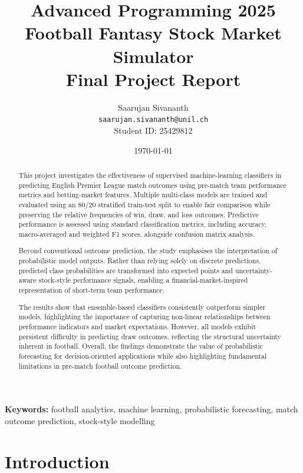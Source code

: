\documentclass[11pt,a4paper]{article}
\title{%
    \Large \textbf{Advanced Programming 2025} \\
    \vspace{0.5cm}
    \LARGE \textbf{Football Fantasy Stock Market Simulator} \\
    \vspace{0.3cm}
    \large Final Project Report
}
\author{
    Saarujan Sivananth \\
    \texttt{saarujan.sivananth@unil.ch} \\
    Student ID: 25429812
}
\date{\today}
\begin{document}
\maketitle
\thispagestyle{empty}

\begin{abstract}
This project investigates the effectiveness of supervised machine-learning classifiers in predicting English Premier League match outcomes using pre-match team performance metrics and betting-market features. Multiple multi-class models are trained and evaluated using an 80/20 stratified train-test split to enable fair comparison while preserving the relative frequencies of win, draw, and loss outcomes. Predictive performance is assessed using standard classification metrics, including accuracy, macro-averaged and weighted F1 scores, alongside confusion matrix analysis.

Beyond conventional outcome prediction, the study emphasises the interpretation of probabilistic model outputs. Rather than relying solely on discrete predictions, predicted class probabilities are transformed into expected points and uncertainty-aware stock-style performance signals, enabling a financial-market-inspired representation of short-term team performance.

The results show that ensemble-based classifiers consistently outperform simpler models, highlighting the importance of capturing non-linear relationships between performance indicators and market expectations. However, all models exhibit persistent difficulty in predicting draw outcomes, reflecting the structural uncertainty inherent in football. Overall, the findings demonstrate the value of probabilistic forecasting for decision-oriented applications while also highlighting fundamental limitations in pre-match football outcome prediction.
\end{abstract}

\vspace{0.5cm}
\noindent\textbf{Keywords:} football analytics, machine learning, probabilistic forecasting, match outcome prediction, stock-style modelling

\newpage
\tableofcontents
\newpage


\section{Introduction}
\label{sec:introduction}
\end{document}
